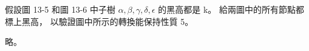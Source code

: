 \startEXERCISE
假設圖 13-5 和圖 13-6 中子樹
 $\alpha,\beta,\gamma,\delta,\epsilon$ 的黑高都是 k。
給兩圖中的所有節點都標上黑高，
以驗證圖中所示的轉換能保持性質 5。
\stopEXERCISE

\startANSWER
略。
\stopANSWER
